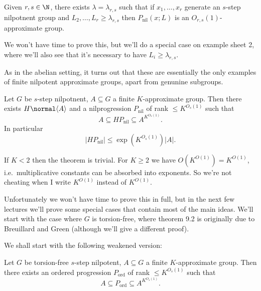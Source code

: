\documentclass[a4paper]{article}
\begin{document}
\begin{proposition}[prop 9.1*]
  Given \(r, s \in \N\), there exists \(\lambda = \lambda_{r, s}\) such that if \(x_1, \dots, x_r\) generate an \(s\)-step nilpotnent group and \(L_2, \dots, L_r \geq \lambda_{r, s}\) then \(P_{\text{nil}}(x; L)\) is an \(O_{r, s}(1)\)-approximate group.
\end{proposition}

We won't have time to prove this, but we'll do a special case on example sheet 2, where we'll also see that it's necessary to have \(L_i \geq \lambda_{r, s}\).

As in the abelian setting, it turns out that these are essentially the only examples of finite nilpotent approximate groups, apart from genunine subgroups.

\begin{theorem}[theorem 9.2]
  Let \(G\) be \(s\)-step nilpotnent, \(A \subseteq G\) a finite \(K\)-approximate group. Then there exists \(H \normal \langle A \rangle\) and a nilprogression \(P_{\text{nil}}\) of rank \(\leq K^{O_s(1)}\) such that
  \[
    A \subseteq HP_{\text{nil}} \subseteq A^{K^{O_s(1)}}.
  \]
  In particular
  \[
    |H P_{\text{nil}}| \leq \exp (K^{O_s(1)}) |A|.
  \]
\end{theorem}

\begin{remark}
  If \(K < 2\) then the theorem is trivial. For \(K \geq 2\) we have \(O(K^{O(1)}) = K^{O(1)}\), i.e.\ multiplicative constants can be absorbed into exponents. So we're not cheating when I write \(K^{O(1)}\) instead of \(K^{O(1)}\).
\end{remark}

Unfortunately we won't have time to prove this in full, but in the next few lectures we'll prove some special cases that contain most of the main ideas. We'll start with the case where \(G\) is torsion-free, where theorem 9.2 is originally due to Breuillard and Green (although we'll give a different proof).

We shall start with the following weakened version:

\begin{theorem}[theorem 9.3]
  Let \(G\) be torsion-free \(s\)-step nilpotent, \(A \subseteq G\) a finite \(K\)-approximate group. Then there exists an ordered progression \(P_{\text{ord}}\) of rank \(\leq K^{O_s(1)}\) such that
  \[
    A \subseteq P_{\text{ord}} \subseteq A^{K^{O_s(1)}}.
  \]
\end{theorem}
\end{document}

